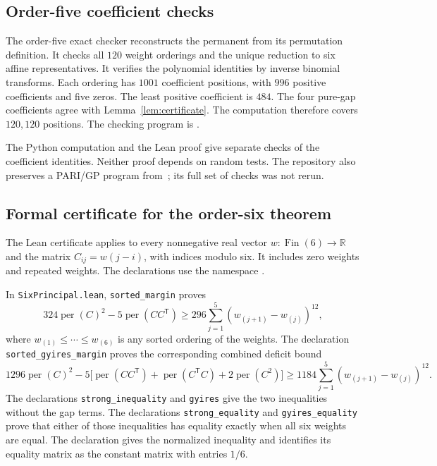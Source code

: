 \documentclass[11pt,a4paper]{article}
\theoremstyle{definition}
\theoremstyle{remark}
\begin{document}
\subsection{Order-five coefficient checks}

The order-five exact checker reconstructs the permanent from its permutation definition.
It checks all $120$ weight orderings and the unique reduction to six affine representatives.
It verifies the polynomial identities by inverse binomial transforms.
Each ordering has $1001$ coefficient positions, with $996$ positive coefficients and five zeros.
The least positive coefficient is $484$.
The four pure-gap coefficients agree with Lemma~\ref{lem:certificate}.
The computation therefore covers $120{,}120$ positions.
The checking program is
.

The Python computation and the Lean proof give separate checks of the coefficient identities.
Neither proof depends on random tests.
The repository also preserves a PARI/GP program from~\cite{repo}; its full set of checks was not rerun.

\subsection{Formal certificate for the order-six theorem}

The Lean certificate applies to every nonnegative real vector
$w\colon\operatorname{Fin}(6)\to\mathbb{R}$ and the matrix
$C_{ij}=w(j-i)$, with indices modulo six. It includes zero weights and
repeated weights. The declarations use the namespace
.

In \texttt{SixPrincipal.lean}, \texttt{sorted\_margin} proves
\[
  324\operatorname{per}(C)^2-5\operatorname{per}(CC^{\mathsf T})
  \geq 296\sum_{j=1}^{5}(w_{(j+1)}-w_{(j)})^{12},
\]
where $w_{(1)}\leq\cdots\leq w_{(6)}$ is any sorted ordering of the
weights. The declaration \texttt{sorted\_gyires\_margin} proves the
corresponding combined deficit bound
\[
  1296\operatorname{per}(C)^2
  -5\bigl[\operatorname{per}(CC^{\mathsf T})
       +\operatorname{per}(C^{\mathsf T}C)
       +2\operatorname{per}(C^2)\bigr]
  \geq 1184\sum_{j=1}^{5}(w_{(j+1)}-w_{(j)})^{12}.
\]
The declarations \texttt{strong\_inequality} and \texttt{gyires} give
the two inequalities without the gap terms. The declarations
\texttt{strong\_equality} and \texttt{gyires\_equality} prove that
either of those inequalities has equality exactly when all six weights
are equal. The declaration  gives
the normalized inequality and identifies its equality matrix as the
constant matrix with entries $1/6$.
\end{document}
